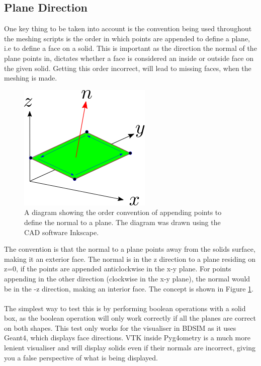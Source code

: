 \documentclass[12pt,a4paper]{article}
\begin{document}
\subsection{Plane Direction}
\label{order}
One key thing to be taken into account is the convention being used throughout the meshing scripts is the order in which points are appended to define a plane, i.e to define a face on a solid. This is important as the direction the normal of the plane points in, dictates whether a face is considered an inside or outside face on the given solid. Getting this order incorrect, will lead to missing faces, when the meshing is made.
\begin{figure}[h!]
\centering
\includegraphics[scale=0.7]{Images//append_points//Point_Appending_Order.png}
\caption[width=\columnwidth]{A diagram showing the order convention of appending points to define the normal to a plane. The diagram was drawn using the CAD software Inkscape.}
\label{pointsorder}
\end{figure}
\newpage
\noindent The convention is that the normal to a plane points away from the solids surface, making it an exterior face. The normal is in the z direction to a plane residing on z=0, if the points are appended anticlockwise in the x-y plane. For points appending in the other direction (clockwise in the x-y plane), the normal would be in the -z direction, making an interior face. The concept is shown in Figure \ref{pointsorder}.
\\\\
The simplest way to test this is by performing boolean operations with a solid box, as the boolean operation will only work correctly if all the planes are correct on both shapes. This test only works for the visualiser in BDSIM as it uses Geant4, which displays face directions. VTK inside Pyg4ometry is a much more lenient visualiser and will display solids even if their normals are incorrect, giving you a false perspective of what is being displayed.
\end{document}
